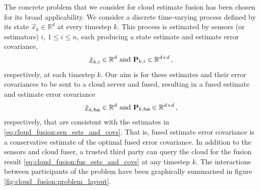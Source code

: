 The concrete problem that we consider for cloud estimate fusion has been chosen for its broad applicability. We consider a discrete time-varying process defined by its state $\vec{x}_k \in \mathbb{R}^d$ at every timestep $k$. This process is estimated by sensors (or estimators) $i$, $1\leq i\leq n$, each producing a state estimate and estimate error covariance,
\begin{equation}\label{eq:cloud_fusion:sen_ests_and_covs}
    \hat{{\underline{x}}}_{k,i} \in \mathbb{R}^d \text{ and } {\ensuremath{{\mathbf{P}}}}_{k,i} \in \mathbb{R}^{d\times d}\,,
\end{equation}
respectively, at each timestep $k$. Our aim is for these estimates and their error covariances to be sent to a cloud server and fused, resulting in a fused estimate and estimate error covariance
\begin{equation}\label{eq:cloud_fusion:fus_ests_and_covs}
    \hat{{\underline{x}}}_{k,\mathsf{fus}} \in \mathbb{R}^d \text{ and } {\ensuremath{{\mathbf{P}}}}_{k,\mathsf{fus}} \in \mathbb{R}^{d\times d}\,,
\end{equation}
respectively, that are consistent with the estimates in \eqref{eq:cloud_fusion:sen_ests_and_covs}. That is, fused estimate error covariance is a conservative estimate of the optimal fused error covariance. In addition to the sensors and cloud fuser, a trusted third party can query the cloud for the fusion result \eqref{eq:cloud_fusion:fus_ests_and_covs} at any timestep $k$. The interactions between participants of the problem have been graphically summarised in figure \ref{fig:cloud_fusion:problem_layout}.
